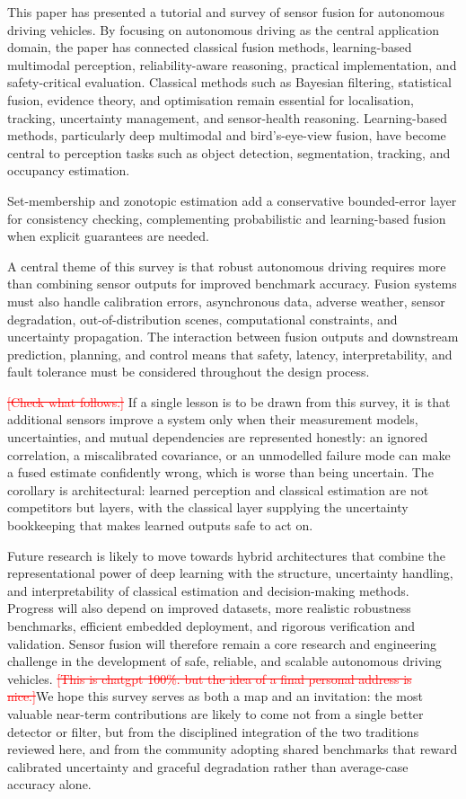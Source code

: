 \documentclass{ieeeaccess}
\newcommand{\added}[1]{\textcolor{RevisionBlue}{#1}}
\newcommand{\deleted}[1]{\textcolor{red}{\sout{#1}}}
\begin{document}
This paper has presented a tutorial and survey of sensor fusion for autonomous driving vehicles. By focusing on autonomous driving as the central application domain, the paper has connected classical fusion methods, learning-based multimodal perception, reliability-aware reasoning, practical implementation, and safety-critical evaluation. Classical methods such as Bayesian filtering, statistical fusion, evidence theory, and optimisation remain essential for localisation, tracking, uncertainty management, and sensor-health reasoning. Learning-based methods, particularly deep multimodal and bird's-eye-view fusion, have become central to perception tasks such as object detection, segmentation, tracking, and occupancy estimation.

Set-membership and zonotopic estimation add a conservative bounded-error layer for consistency checking, complementing probabilistic and learning-based fusion when explicit guarantees are needed.

A central theme of this survey is that robust autonomous driving requires more than combining sensor outputs for improved benchmark accuracy. Fusion systems must also handle calibration errors, asynchronous data, adverse weather, sensor degradation, out-of-distribution scenes, computational constraints, and uncertainty propagation. The interaction between fusion outputs and downstream prediction, planning, and control means that safety, latency, interpretability, and fault tolerance must be considered throughout the design process.

\deleted{[Check what follows.]} %
\added{If a single lesson is to be drawn from this survey, it is that additional sensors improve a system only when their measurement models, uncertainties, and mutual dependencies are represented honestly: an ignored correlation, a miscalibrated covariance, or an unmodelled failure mode can make a fused estimate confidently wrong, which is worse than being uncertain. The corollary is architectural: learned perception and classical estimation are not competitors but layers, with the classical layer supplying the uncertainty bookkeeping that makes learned outputs safe to act on.}

Future research is likely to move towards hybrid architectures that combine the representational power of deep learning with the structure, uncertainty handling, and interpretability of classical estimation and decision-making methods. Progress will also depend on improved datasets, more realistic robustness benchmarks, efficient embedded deployment, and rigorous verification and validation. Sensor fusion will therefore remain a core research and engineering challenge in the development of safe, reliable, and scalable autonomous driving vehicles. \deleted{[This is chatgpt 100\%. but the idea of a final personal address is nice.]}\added{We hope this survey serves as both a map and an invitation: the most valuable near-term contributions are likely to come not from a single better detector or filter, but from the disciplined integration of the two traditions reviewed here, and from the community adopting shared benchmarks that reward calibrated uncertainty and graceful degradation rather than average-case accuracy alone.}
\end{document}
